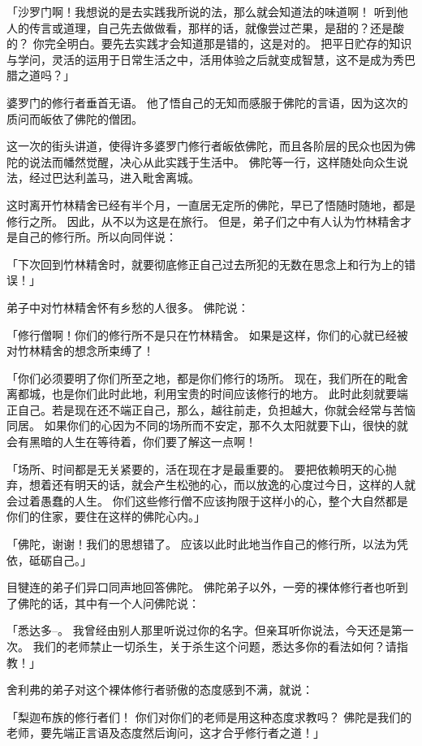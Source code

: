 \documentclass[twoside,openany]{book}
\begin{document}
「沙罗门啊！我想说的是去实践我所说的法，那么就会知道法的味道啊！
听到他人的传言或道理，自己先去做做看，那样的话，就像尝过芒果，是甜的？还是酸的？
你完全明白。要先去实践才会知道那是错的，这是对的。
把平日贮存的知识与学问，灵活的运用于日常生活之中，活用体验之后就变成智慧，这不是成为秀巴腊之道吗？」

婆罗门的修行者垂首无语。
他了悟自己的无知而感服于佛陀的言语，因为这次的质问而皈依了佛陀的僧团。

这一次的街头讲道，使得许多婆罗门修行者皈依佛陀，而且各阶层的民众也因为佛陀的说法而幡然觉醒，决心从此实践于生活中。
佛陀等一行，这样随处向众生说法，经过巴达利盖马，进入毗舍离城。

这时离开竹林精舍已经有半个月，一直居无定所的佛陀，早已了悟随时随地，都是修行之所。
因此，从不以为这是在旅行。
但是，弟子们之中有人认为竹林精舍才是自己的修行所。所以向同伴说：

「下次回到竹林精舍时，就要彻底修正自己过去所犯的无数在思念上和行为上的错误！」

弟子中对竹林精舍怀有乡愁的人很多。
佛陀说：

「修行僧啊！你们的修行所不是只在竹林精舍。
如果是这样，你们的心就已经被对竹林精舍的想念所束缚了！

「你们必须要明了你们所至之地，都是你们修行的场所。
现在，我们所在的毗舍离都城，也是你们此时此地，利用宝贵的时间应该修行的地方。
此时此刻就要端正自己。若是现在还不端正自己，那么，越往前走，负担越大，你就会经常与苦恼同居。
如果你们的心因为不同的场所而不安定，那不久太阳就要下山，很快的就会有黑暗的人生在等待着，你们要了解这一点啊！

「场所、时间都是无关紧要的，活在现在才是最重要的。
要把依赖明天的心抛弃，想着还有明天的话，就会产生松弛的心，而以放逸的心度过今日，这样的人就会过着愚蠢的人生。
你们这些修行僧不应该拘限于这样小的心，整个大自然都是你们的住家，要住在这样的佛陀心内。」

「佛陀，谢谢！我们的思想错了。
应该以此时此地当作自己的修行所，以法为凭依，砥砺自己。」

目犍连的弟子们异口同声地回答佛陀。
佛陀弟子以外，一旁的裸体修行者也听到了佛陀的话，其中有一个人问佛陀说：

「悉达多--。		
我曾经由别人那里听说过你的名字。但亲耳听你说法，今天还是第一次。
我们的老师禁止一切杀生，关于杀生这个问题，悉达多你的看法如何？请指教！」

舍利弗的弟子对这个裸体修行者骄傲的态度感到不满，就说：

「梨迦布族的修行者们！
你们对你们的老师是用这种态度求教吗？
佛陀是我们的老师，要先端正言语及态度然后询问，这才合乎修行者之道！」
\end{document}
